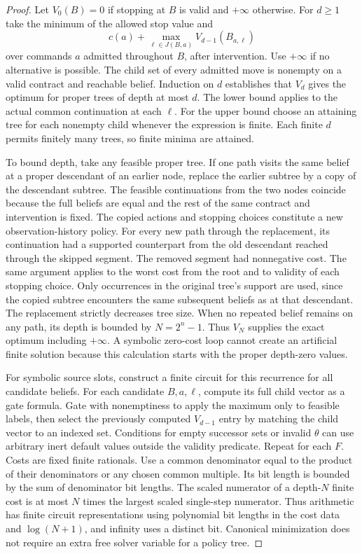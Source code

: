 \begin{proof}
Let \(V_0(B)=0\) if stopping at \(B\) is valid and \(+\infty\) otherwise. For \(d\ge 1\) take the minimum of the allowed stop value and
\[
 c(a)+\max_{\ell \in J(B,a)} V_{d-1}(B_{a,\ell})
\]
over commands \(a\) admitted throughout \(B\), after intervention. Use \(+\infty\) if no alternative is possible. The child set of every admitted move is nonempty on a valid contract and reachable belief. Induction on \(d\) establishes that \(V_d\) gives the optimum for proper trees of depth at most \(d\). The lower bound applies to the actual common continuation at each \(\ell\). For the upper bound choose an attaining tree for each nonempty child whenever the expression is finite. Each finite \(d\) permits finitely many trees, so finite minima are attained.

To bound depth, take any feasible proper tree. If one path visits the same belief at a proper descendant of an earlier node, replace the earlier subtree by a copy of the descendant subtree. The feasible continuations from the two nodes coincide because the full beliefs are equal and the rest of the same contract and intervention is fixed. The copied actions and stopping choices constitute a new observation-history policy. For every new path through the replacement, its continuation had a supported counterpart from the old descendant reached through the skipped segment. The removed segment had nonnegative cost. The same argument applies to the worst cost from the root and to validity of each stopping choice. Only occurrences in the original tree's support are used, since the copied subtree encounters the same subsequent beliefs as at that descendant. The replacement strictly decreases tree size. When no repeated belief remains on any path, its depth is bounded by \(N=2^n-1\). Thus \(V_N\) supplies the exact optimum including \(+\infty\). A symbolic zero-cost loop cannot create an artificial finite solution because this calculation starts with the proper depth-zero values.

For symbolic source slots, construct a finite circuit for this recurrence for all candidate beliefs. For each candidate \(B,a,\ell\), compute its full child vector as a gate formula. Gate with nonemptiness to apply the maximum only to feasible labels, then select the previously computed \(V_{d-1}\) entry by matching the child vector to an indexed set. Conditions for empty successor sets or invalid \(\theta\) can use arbitrary inert default values outside the validity predicate. Repeat for each \(F\). Costs are fixed finite rationals. Use a common denominator equal to the product of their denominators or any chosen common multiple. Its bit length is bounded by the sum of denominator bit lengths. The scaled numerator of a depth-\(N\) finite cost is at most \(N\) times the largest scaled single-step numerator. Thus arithmetic has finite circuit representations using polynomial bit lengths in the cost data and \(\log(N+1)\), and infinity uses a distinct bit. Canonical minimization does not require an extra free solver variable for a policy tree.


\end{proof}
